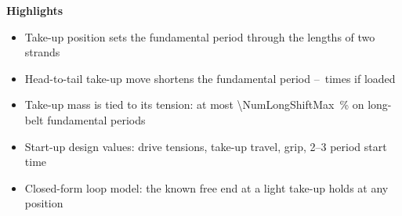 \documentclass[a4paper,11pt]{article}
\begin{document}
\noindent\textbf{Highlights}
\begin{itemize}
  \item Take-up position sets the fundamental period through the lengths of two strands
  \item Head-to-tail take-up move shortens the fundamental period \NumHeadTailRatioGammaThree--\NumHeadTailRatioGammaOneFive\ times if loaded
  \item Take-up mass is tied to its tension: at most \qty{\NumLongShiftMax}{\percent} on long-belt
        fundamental periods
  \item Start-up design values: drive tensions, take-up travel, grip, 2--3 period start time
  \item Closed-form loop model: the known free end at a light take-up holds at any position
\end{itemize}
\end{document}

